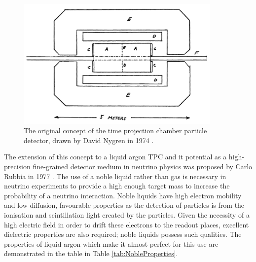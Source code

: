 \begin{figure}[ht]
  \centering
  \includegraphics[width=10cm]{NygrenTPC.png}
  \caption{The original concept of the time projection chamber particle detector, drawn by David Nygren in 1974 \cite{Nygren1974}.}
  \label{fig:NygrenTPC}
\end{figure}

The extension of this concept to a liquid argon TPC and it potential as a high-precision fine-grained detector medium in neutrino physics was proposed by Carlo Rubbia in 1977 \cite{Rubbia1977}.  The use of a noble liquid rather than gas is necessary in neutrino experiments to provide a high enough target mass to increase the probability of a neutrino interaction.  Noble liquids have high electron mobility and low diffusion, favourable properties as the detection of particles is from the ionisation and scintillation light created by the particles.  Given the necessity of a high electric field in order to drift these electrons to the readout places, excellent dielectric properties are also required; noble liquids possess such qualities.  The properties of liquid argon which make it almost perfect for this use are demonstrated in the table in Table \ref{tab:NobleProperties}.

